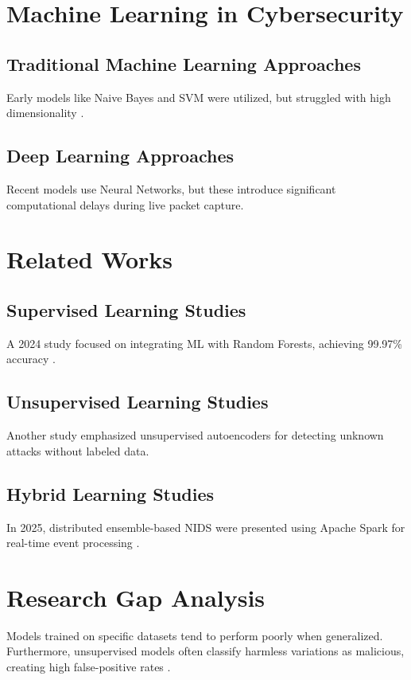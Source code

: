 \documentclass[12pt, a4paper]{report}
\begin{document}
\section{Machine Learning in Cybersecurity}
\subsection{Traditional Machine Learning Approaches}
Early models like Naive Bayes and SVM were utilized, but struggled with high dimensionality \cite{ref6}.
\subsection{Deep Learning Approaches}
Recent models use Neural Networks, but these introduce significant computational delays during live packet capture.

\section{Related Works}
\subsection{Supervised Learning Studies}
A 2024 study focused on integrating ML with Random Forests, achieving 99.97\% accuracy \cite{ref7}.
\subsection{Unsupervised Learning Studies}
Another study emphasized unsupervised autoencoders for detecting unknown attacks without labeled data.
\subsection{Hybrid Learning Studies}
In 2025, distributed ensemble-based NIDS were presented using Apache Spark for real-time event processing \cite{ref8}. 

\section{Research Gap Analysis}
Models trained on specific datasets tend to perform poorly when generalized. Furthermore, unsupervised models often classify harmless variations as malicious, creating high false-positive rates \cite{ref9}.

\end{document}
